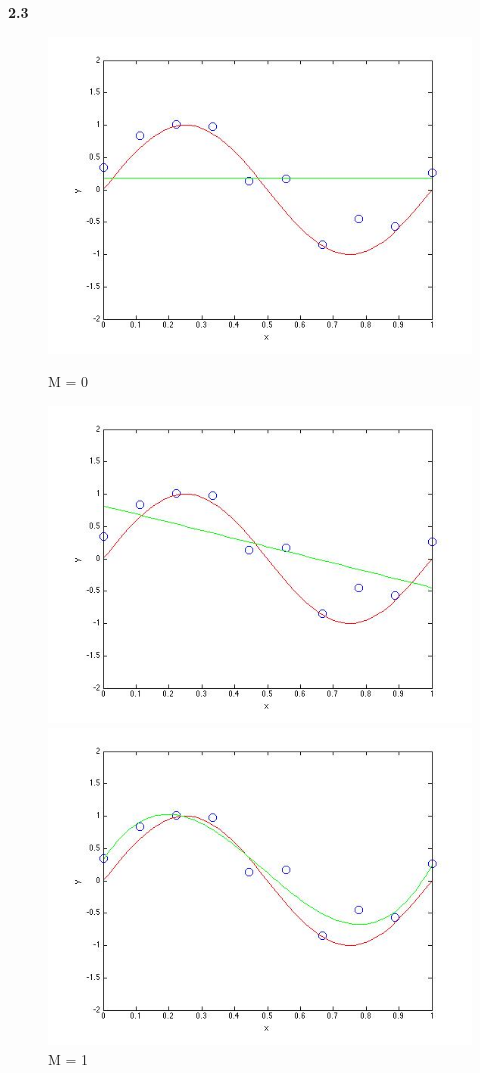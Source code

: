 {\bfseries 2.3}

\begin{figure}[!htb]
  \includegraphics[width=\linewidth]{figures/p2_M=0}
  \caption{M = 0}\label{fig:figures/p2_M=0}
\endminipage\hfill
{}
  \includegraphics[width=\linewidth]{figures/p2_M=1}
  \caption{M = 1}\label{fig:figures/p2_M=1}
\endminipage\hfill
{}                                                                            
  \includegraphics[width=\linewidth]{figures/p2_M=3}

\end{figure}
